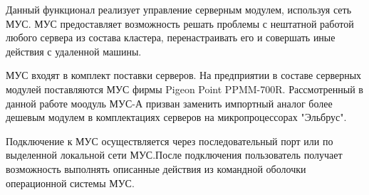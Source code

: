 Данный функционал реализует управление серверным модулем, используя сеть МУС. МУС предоставляет возможность решать проблемы с нештатной работой любого сервера из состава кластера, перенастраивать его и совершать иные действия с удаленной машины.

МУС входят в комплект поставки серверов. На предприятии в составе серверных модулей поставляются МУС фирмы Pigeon Point PPMM-700R. Рассмотренный в данной работе моодуль МУС-А призван заменить импортный аналог более дешевым модулем в комплектациях серверов на микропроцессорах "Эльбрус".
 
Подключение к МУС осуществляется через последовательный порт или по выделенной локальной сети МУС.После подключения пользователь получает возможность выполнять описанные действия из командной оболочки операционной системы МУС.

\clearpage
